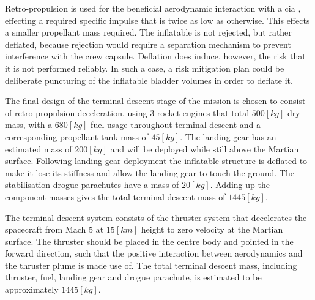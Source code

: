Retro-propulsion is used for the beneficial aerodynamic interaction with a \gls{cia} \cite{Korzun2009}, effecting a required specific impulse that is twice as low as otherwise. This effects a smaller propellant mass required. The inflatable is not rejected, but rather deflated, because rejection would require a separation mechanism to prevent interference with the crew capsule. Deflation does induce, however, the risk that it is not performed reliably. In such a case, a risk mitigation plan could be deliberate puncturing of the inflatable bladder volumes in order to deflate it.

The final design of the terminal descent stage of the mission is chosen to consist of retro-propulsion deceleration, using 3 rocket engines that total $500 \left[kg\right]$ dry mass, with a $680 \left[kg\right]$ fuel usage throughout terminal descent and a corresponding propellant tank mass of $45 \left[kg\right]$. The landing gear has an estimated mass of $200 \left[kg\right]$ and will be deployed while still above the Martian surface. Following landing gear deployment the inflatable structure is deflated to make it lose its stiffness and allow the landing gear to touch the ground. The stabilisation drogue parachutes have a mass of $20 \left[kg\right]$. Adding up the component masses gives the total terminal descent mass of $1445 \left[kg\right]$.

The terminal descent system consists of the thruster system that decelerates the spacecraft from Mach $5$ at $15 \left[km\right]$ height to zero velocity at the Martian surface. The thruster should be placed in the centre body and pointed in the forward direction, such that the positive interaction between aerodynamics and the thruster plume is made use of. The total terminal descent mass, including thruster, fuel, landing gear and drogue parachute, is estimated to be approximately $1445 \left[kg\right]$.